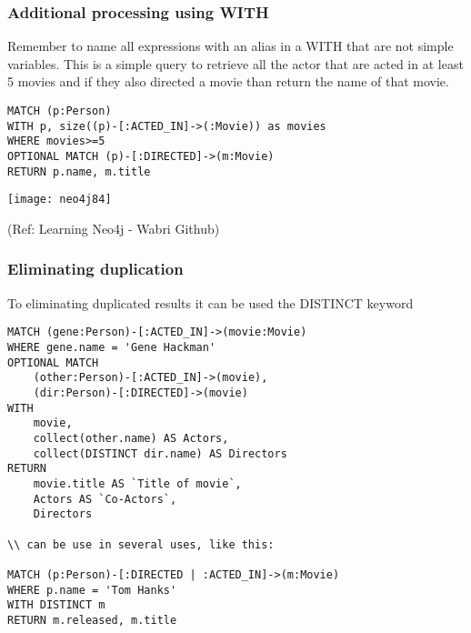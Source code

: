 \begin{frame}[fragile]\frametitle{Additional processing using WITH}

Remember to name all expressions with an alias in a WITH that are not simple variables. This is a simple query to retrieve all the actor that are acted in at least 5 movies and if they also directed a movie than return the name of that movie.


\begin{lstlisting}
MATCH (p:Person)
WITH p, size((p)-[:ACTED_IN]->(:Movie)) as movies
WHERE movies>=5
OPTIONAL MATCH (p)-[:DIRECTED]->(m:Movie)
RETURN p.name, m.title

\end{lstlisting}


\begin{center}
\texttt{[image: neo4j84]}
\end{center}	


{\tiny (Ref: Learning Neo4j - Wabri Github)}
\end{frame}

\begin{frame}[fragile]\frametitle{Eliminating duplication}

To eliminating duplicated results it can be used the DISTINCT keyword



\begin{lstlisting}
MATCH (gene:Person)-[:ACTED_IN]->(movie:Movie)
WHERE gene.name = 'Gene Hackman'
OPTIONAL MATCH
    (other:Person)-[:ACTED_IN]->(movie),
    (dir:Person)-[:DIRECTED]->(movie)
WITH
    movie,
    collect(other.name) AS Actors,
    collect(DISTINCT dir.name) AS Directors
RETURN
    movie.title AS `Title of movie`,
    Actors AS `Co-Actors`,
    Directors

\\ can be use in several uses, like this:

MATCH (p:Person)-[:DIRECTED | :ACTED_IN]->(m:Movie)
WHERE p.name = 'Tom Hanks'
WITH DISTINCT m
RETURN m.released, m.title
\end{lstlisting}

\end{frame}

